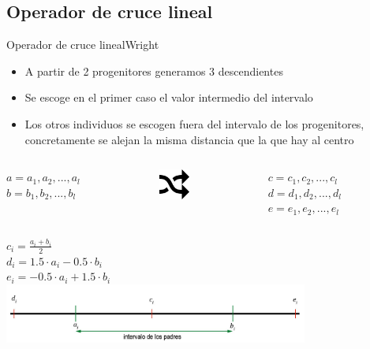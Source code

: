 \documentclass[10pt]{beamer}
\begin{document}
\subsection{Operador de cruce lineal}

\begin{frame}{Operador de cruce lineal}{Wright}
		\begin{itemize}
			\item A partir de 2 progenitores generamos 3 descendientes
			\item Se escoge en el primer caso el valor intermedio del intervalo 
			\item Los otros individuos se escogen fuera del intervalo de los progenitores, concretamente se alejan la misma distancia que la que hay al centro
		\end{itemize}
		\begin{columns}[t]
			\begin{column}{0.4\textwidth}
				\begin{flushright}
					$a=a_{1} , a_{2}, ... , a_{l}$
					\\ $b=b_{1} , b_{2}, ... , b_{l}$ 
				\end{flushright}
			\end{column}
			\begin{column}{0.2\textwidth}
				\begin{center}
					\includegraphics[width=1cm]{arrow}
				\end{center}
			\end{column}
			\begin{column}{0.4\textwidth}
				\begin{flushleft}
					$c=c_{1} , c_{2}, ... , c_{l}$
					\\ $d=d_{1} , d_{2}, ... , d_{l}$ 
					\\ $e=e_{1} , e_{2}, ... , e_{l}$ 
				\end{flushleft}
			\end{column}
		\end{columns}
		
		\begin{center}
			$c_{i}= \frac {a_i+b_i} {2}$
			\\$d_i = 1.5 \cdot a_i-0.5 \cdot b_i$
			\\$e_i = -0.5 \cdot a_i+1.5 \cdot b_i$
			\includegraphics[width=10cm]{crucelineal}
		\end{center}
\end{frame}
\end{document}
